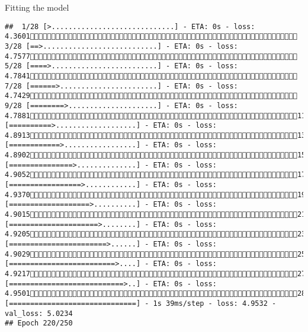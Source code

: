 \documentclass[
  ignorenonframetext,
]{beamer}
\begin{document}
\begin{frame}[fragile]{Fitting the model}
\begin{verbatim}
##  1/28 [>.............................] - ETA: 0s - loss: 4.3601 3/28 [==>...........................] - ETA: 0s - loss: 4.7577 5/28 [====>.........................] - ETA: 0s - loss: 4.7841 7/28 [======>.......................] - ETA: 0s - loss: 4.7429 9/28 [========>.....................] - ETA: 0s - loss: 4.788111/28 [==========>...................] - ETA: 0s - loss: 4.891313/28 [============>.................] - ETA: 0s - loss: 4.890215/28 [===============>..............] - ETA: 0s - loss: 4.905217/28 [=================>............] - ETA: 0s - loss: 4.937019/28 [===================>..........] - ETA: 0s - loss: 4.901521/28 [=====================>........] - ETA: 0s - loss: 4.920523/28 [=======================>......] - ETA: 0s - loss: 4.902925/28 [=========================>....] - ETA: 0s - loss: 4.921727/28 [===========================>..] - ETA: 0s - loss: 4.950128/28 [==============================] - 1s 39ms/step - loss: 4.9532 - val_loss: 5.0234
## Epoch 220/250

\end{verbatim}
\end{frame}
\end{document}
